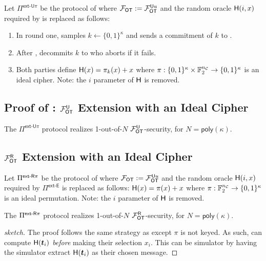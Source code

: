 

\begin{definition}\label{def:ext_U_U}
	Let $\Pi^{\textsf{ext-U}\pi}$ be the protocol of  where $\mathcal{F}_{\mathsf{OT}}:=\mathcal{F}_{\mathsf{OT}}^{\mathsf{U} u}$ and the random oracle $\mathsf{H}(i,x)$ required by  is replaced as follows:
	\begin{enumerate}
		\item In round one, \send samples $k\gets\{0,1\}^{\kappa}$ and sends a commitment of $k$ to \rec.
		\item After , \send decommits $k$ to \rec who aborts if it fails.
		\item Both parties define $\mathsf{H}(x)=\pi_k(x)+x$ where $\pi:\{0,1\}^{\kappa} \times \mathbb{F}^{{n_\mathcal{C}}}_2 \rightarrow\{0,1\}^\kappa$ is an ideal cipher. Note: the $i$ parameter of $\mathsf{H}$ is removed.
	\end{enumerate}
\end{definition}

\subsection{Proof of :  $\mathcal{F}_{\mathsf{OT}}^\mathsf{U}$ Extension with an Ideal Cipher}
\begin{lemma}\label{lem:ext_U_U}
	The $\Pi^{\textsf{ext-U}\pi}$ protocol realizes 1-out-of-$N$ $\mathcal{F}_{\mathsf{OT}}^\mathsf{U}$-security, for $N=\textsf{poly}(\kappa)$.
\end{lemma}





\subsection{ $\mathcal{F}_{\mathsf{OT}}^\mathsf{R}$ Extension with an Ideal Cipher}

\begin{definition}\label{def:ext_S_R}
	Let $\Pi^{\textsf{ext-\ensuremath{\mathsf{R}}}\pi}$ be the protocol of  where $\mathcal{F}_{\mathsf{OT}}:=\mathcal{F}_{\mathsf{OT}}^{\mathsf{U} u}$ and the random oracle $\mathsf{H}(i,x)$ required by $\Pi^{\textsf{ext-E}}$ is replaced as follows: $\mathsf{H}(x)=\pi(x)+x$ where $\pi: \mathbb{F}^{{n_\mathcal{C}}}_2 \rightarrow\{0,1\}^\kappa$ is an ideal permutation. Note: the $i$ parameter of $\mathsf{H}$ is removed.
\end{definition}
\begin{lemma}\label{lem:ext_S_R}
	The $\Pi^{\textsf{ext-\ensuremath{\mathsf{R}}}\pi}$ protocol realizes 1-out-of-$N$ $\mathcal{F}_{\mathsf{OT}}^\mathsf{R}$-security, for $N=\textsf{poly}(\kappa)$.
\end{lemma}
\begin{proof}[sketch]
	The proof follows the same strategy as  except $\pi$ is not keyed. As such, \rec can compute $\mathsf{H}(\boldsymbol{t}_i)$ \emph{before} making their selection $x_i$. This can be simulator by having the simulator extract $\mathsf{H}(\boldsymbol{t}_i)$ as their chosen message. 
\end{proof}

